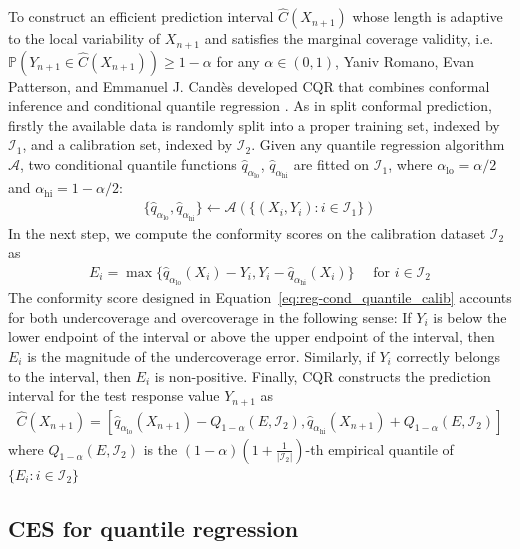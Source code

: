 To construct an efficient prediction interval $\hat{C}(X_{n+1})$ whose length is adaptive to the local variability of $X_{n+1}$ and satisfies the marginal coverage validity, i.e. $\mathbb{P}(Y_{n+1} \in \hat{C}(X_{n+1})) \geq 1-\alpha$ for any $\alpha \in (0,1)$, Yaniv Romano, Evan Patterson, and Emmanuel J. Candès developed CQR that combines conformal inference \cite{vovk1999machine} \cite{vovk2005algorithmic} and conditional quantile regression \cite{koenker1978quantreg}. As in split conformal prediction, firstly the available data is  randomly split into a proper training set, indexed by $\mathcal{I}_1$, and a calibration set, indexed by $\mathcal{I}_2$. Given any quantile regression algorithm $\mathcal{A}$, two conditional quantile functions $\hat{q}_{\alpha_{\text{lo}}}$, $\hat{q}_{\alpha_{\text{hi}}}$ are fitted on $\mathcal{I}_1$, where $\alpha_{\text{lo}} = \alpha/2$ and $\alpha_{\text{hi}} = 1-\alpha/2$: 
\begin{align} \label{eq:reg-cond_quantile_fit}
    \{ \hat{q}_{\alpha_{\text{lo}}}, \hat{q}_{\alpha_{\text{hi}}} \} \leftarrow \mathcal{A}(\{ (X_i, Y_i): i \in \mathcal{I}_1 \})
\end{align}
In the next step, we compute the conformity scores on the calibration dataset $\mathcal{I}_2$ as 
\begin{align} \label{eq:reg-cond_quantile_calib}
    E_i = \max \{ \hat{q}_{\alpha_{\text{lo}}}(X_i) - Y_i, Y_i - \hat{q}_{\alpha_{\text{hi}}}(X_i) \} \quad \text{ for } i \in \mathcal{I}_2
\end{align}
The conformity score designed in Equation~\ref{eq:reg-cond_quantile_calib} accounts for both undercoverage and overcoverage in the following sense: If $Y_i$ is below the lower endpoint of the interval or above the upper endpoint of the interval, then $E_i$ is the magnitude of the undercoverage error. Similarly, if $Y_i$ correctly belongs to the interval, then $E_i$ is non-positive. 
Finally, CQR constructs the prediction interval for the test response value $Y_{n+1}$ as
\begin{align} \label{eq:reg-cond_quantile_construct_pi}
    \hat{C}(X_{n+1}) = [ \hat{q}_{\alpha_{\text{lo}}}(X_{n+1}) - Q_{1-\alpha}(E, \mathcal{I}_2), \hat{q}_{\alpha_{\text{hi}}}(X_{n+1}) + Q_{1-\alpha}(E, \mathcal{I}_2)
    ]
\end{align}
where $Q_{1-\alpha}(E, \mathcal{I}_2)$ is the $(1-\alpha)(1+\frac{1}{|\mathcal{I}_2|})$-th empirical quantile of $\{E_i: i\in \mathcal{I}_2\}$


\subsection{CES for quantile regression}

